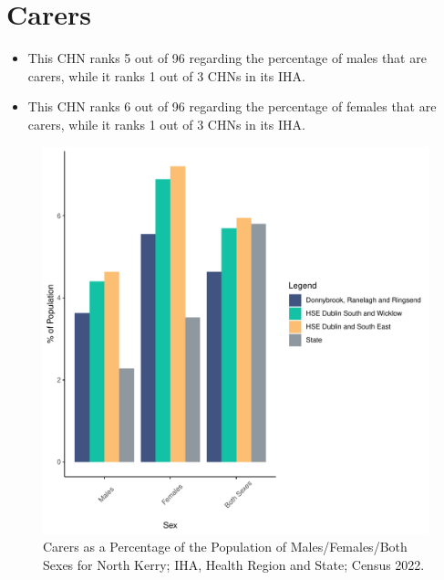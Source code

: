 \documentclass{article}
\begin{document}
\section{Carers}\label{sect:Carers}
\begin{itemize}
\item This CHN ranks  5 out of 96 regarding the percentage of males that are carers, while it ranks   1 out of 3 CHNs in its IHA.
\item This CHN ranks  6 out of 96 regarding the percentage of females that are carers, while it ranks   1 out of 3 CHNs in its IHA.
\end{itemize}
\begin{figure}[H]
	\centering
	\includegraphics[width = 150mm]{../figures/CareED.pdf}
	\caption{Carers as a Percentage of the Population of Males/Females/Both Sexes for North Kerry; IHA, Health Region and State; Census 2022.}
	\label{fig:2ae19629-1a6a-13a3-e055-000000000001}
	\end{figure}
\end{document}
